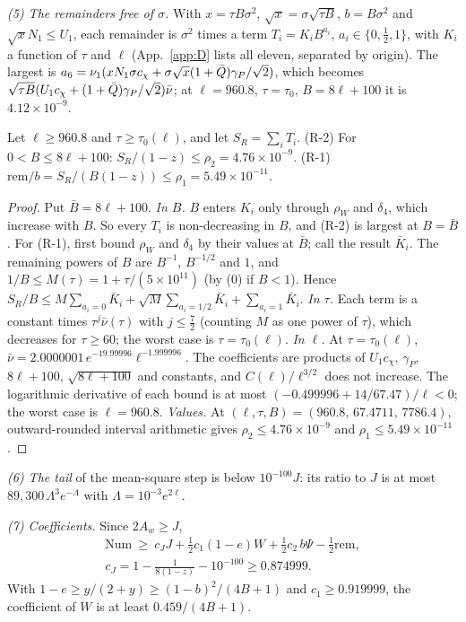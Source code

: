 \emph{(5) The remainders free of $\sigma$.}
With $x=\tau B\sigma^2$, $\sqrt x=\sigma\sqrt{\tau B}$, $b=B\sigma^2$ and $\sqrt xN_1\le U_1$, each remainder is $\sigma^2$ times a term $T_i=K_iB^{a_i}$, $a_i\in\{0,\tfrac12,1\}$, with $K_i$ a function of $\tau$ and $\ell$ (App.~\ref{app:D} lists all eleven, separated by origin).
The largest is $a_6=\nu_1(xN_1\sigma c_\chi+\sigma\sqrt x(1+\bar Q)\gamma_P/\sqrt2)$, which becomes $\sqrt{\tau B}(U_1c_\chi+(1+\bar Q)\gamma_P/\sqrt2)\bar\nu$; at $\ell=960.8$, $\tau=\tau_0$, $B=8\ell+100$ it is $4.12\times10^{-9}$.

\begin{lemma}[remainders] 
\label{lem:R}
Let $\ell\ge960.8$ and $\tau\ge\tau_0(\ell)$, and let $S_R=\sum_iT_i$.
(R-2) For $0<B\le8\ell+100$: $S_R/(1-z)\le\rho_2=4.76\times10^{-9}$.
(R-1) $\mathrm{rem}/b=S_R/(B(1-z))\le\rho_1=5.49\times10^{-11}$.
\end{lemma}
\begin{proof}
Put $\bar B=8\ell+100$.
\emph{In $B$.} $B$ enters $K_i$ only through $\rho_W$ and $\delta_4$, which increase with $B$. So every $T_i$ is non-decreasing in $B$, and (R-2) is largest at $B=\bar B$. For (R-1), first bound $\rho_W$ and $\delta_4$ by their values at $\bar B$; call the result $\bar K_i$. The remaining powers of $B$ are $B^{-1}$, $B^{-1/2}$ and $1$, and $1/B\le M(\tau)=1+\tau/(5\times10^{11})$ (by (0) if $B<1$). Hence $S_R/B\le M\sum_{a_i=0}\bar K_i+\sqrt M\sum_{a_i=1/2}\bar K_i+\sum_{a_i=1}\bar K_i$.
\emph{In $\tau$.} Each term is a constant times $\tau^j\bar\nu(\tau)$ with $j\le\tfrac72$ (counting $M$ as one power of $\tau$), which decreases for $\tau\ge60$; the worst case is $\tau=\tau_0(\ell)$.
\emph{In $\ell$.} At $\tau=\tau_0(\ell)$, $\bar\nu=2.0000001\,e^{-19.99996}\ell^{-1.999996}$. The coefficients are products of $U_1c_\chi$, $\gamma_P$, $8\ell+100$, $\sqrt{8\ell+100}$ and constants, and $C(\ell)/\ell^{3/2}$ does not increase. The logarithmic derivative of each bound is at most $(-0.499996+14/67.47)/\ell<0$; the worst case is $\ell=960.8$.
\emph{Values.} At $(\ell,\tau,B)=(960.8,\,67.4711,\,7786.4)$, outward-rounded interval arithmetic gives $\rho_2\le4.76\times10^{-9}$ and $\rho_1\le5.49\times10^{-11}$.
\end{proof}

\emph{(6) The tail} of the mean-square step is below $10^{-100}J$: its ratio to $J$ is at most $89{,}300\,\Lambda^3e^{-\Lambda}$ with $\Lambda=10^{-3}e^{2\ell}$.

\emph{(7) Coefficients.} Since $2A_w\ge J$,
\begin{gather}
\mathrm{Num}\ \ge\ c_JJ+\tfrac12c_1(1-e)W+\tfrac12c_2\,b\Psi-\tfrac12\mathrm{rem},\nonumber\\ c_J=1-\frac1{8(1-z)}-10^{-100}\ge0.874999 .
\end{gather}
With $1-e\ge y/(2+y)\ge(1-b)^2/(4B+1)$ and $c_1\ge0.919999$, the coefficient of $W$ is at least $0.459/(4B+1)$.

